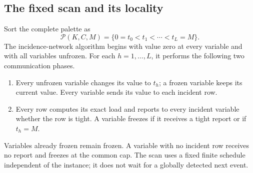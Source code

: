 \documentclass[11pt,a4paper]{article}
\theoremstyle{definition}
\theoremstyle{remark}
\begin{document}
\subsection{The fixed scan and its locality}

Sort the complete palette as
\[
 \mathcal P(K,C,M)=\{0=t_0<t_1<\cdots<t_L=M\}.
\]
The incidence-network algorithm begins with value zero at every variable
and with all variables unfrozen.  For each $h=1,\ldots,L$, it performs
the following two communication phases.
\begin{enumerate}
\item Every unfrozen variable changes its value to $t_h$; a frozen
variable keeps its current value.  Every variable sends its value to
each incident row.
\item Every row computes its exact load and reports to every incident
variable whether the row is tight.  A variable freezes if it receives
a tight report or if $t_h=M$.
\end{enumerate}
Variables already frozen remain frozen.  A variable with no incident
row receives no report and freezes at the common cap.  The scan uses a
fixed finite schedule independent of the instance; it does not wait for
a globally detected next event.
\end{document}
